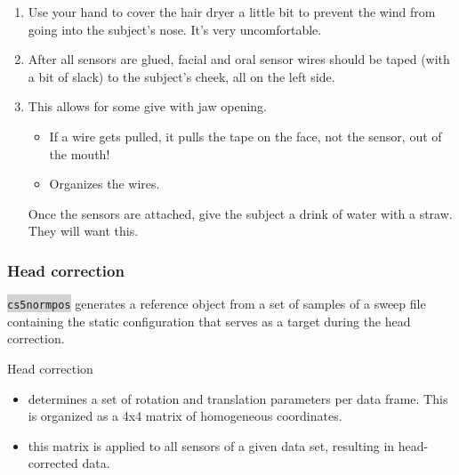 \documentclass[12pt]{article}
\begin{document}
\begin{enumerate}
        \item Use your hand to cover the hair dryer a little bit to prevent the wind from going into the subject's nose. It's very uncomfortable.
        
        \item After all sensors are glued, facial and oral sensor wires should be taped (with a bit of slack) to the subject’s cheek, all on the left side.
        
        \item This allows for some give with jaw opening.
        
        \begin{itemize}
            \item If a wire gets pulled, it pulls the tape on the face, not the sensor, out of the mouth!
            \item Organizes the wires.
        \end{itemize}

Once the sensors are attached, give the subject a drink of water with a straw. They will want this.
    \end{enumerate}

    \subsubsection{Head correction}
    \colorbox{lightgray}{\texttt{cs5normpos}} generates a reference object from a set of samples of a sweep file containing the static configuration that serves as a target during the head correction.
    
    \bigskip
    
        Head correction
        \begin{itemize}
            \item determines a set of rotation and translation parameters per data frame. This is organized as a 4x4 matrix of homogeneous coordinates.
            \item this matrix is applied to all sensors of a given data set, resulting in head-corrected data.
        \end{itemize}
    
\end{document}
